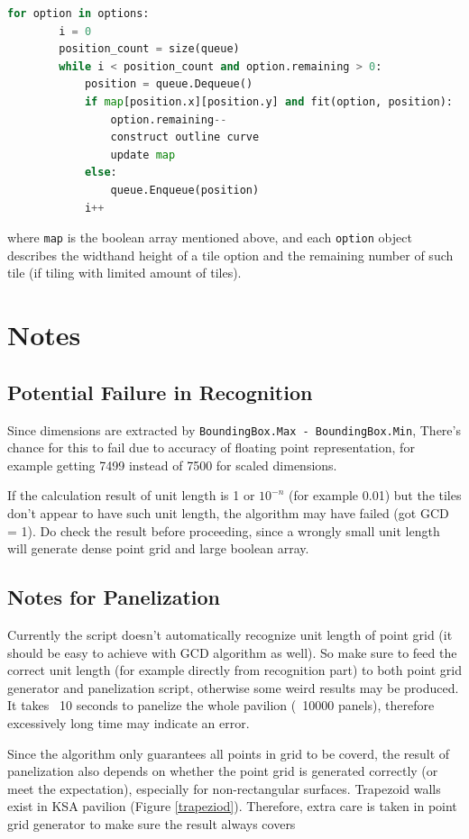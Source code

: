 \documentclass{article}
\begin{document}
\begin{lstlisting}[language=Python]
	for option in options:
		i = 0
		position_count = size(queue)
		while i < position_count and option.remaining > 0:
			position = queue.Dequeue()
			if map[position.x][position.y] and fit(option, position):
				option.remaining--
				construct outline curve
				update map
			else:
				queue.Enqueue(position)
			i++
\end{lstlisting}

where \lstinline{map} is the boolean array mentioned above, and each \lstinline{option} object describes the widthand height of a tile option and the remaining number of such tile (if tiling with limited amount of tiles).

\section{Notes}

\subsection{Potential Failure in Recognition}

Since dimensions are extracted by \lstinline{BoundingBox.Max - BoundingBox.Min}, There's chance for this to fail due to accuracy of floating point representation, for example getting 7499 instead of 7500 for scaled dimensions.

If the calculation result of unit length is 1 or $10^{-n}$ (for example 0.01) but the tiles don't appear to have such unit length, the algorithm may have failed (got GCD = 1). Do check the result before proceeding, since a wrongly small unit length will generate dense point grid and large boolean array.

\subsection{Notes for Panelization}

Currently the script doesn't automatically recognize unit length of point grid (it should be easy to achieve with GCD algorithm as well). So make sure to feed the correct unit length (for example directly from recognition part) to both point grid generator and panelization script, otherwise some weird results may be produced. It takes ~10 seconds to panelize the whole pavilion (~10000 panels), therefore excessively long time may indicate an error.

Since the algorithm only guarantees all points in grid to be coverd, the result of panelization also depends on whether the point grid is generated correctly (or meet the expectation), especially for non-rectangular surfaces. Trapezoid walls exist in KSA pavilion (Figure \ref{trapeziod}). Therefore, extra care is taken in point grid generator to make sure the result always covers 
\end{document}
